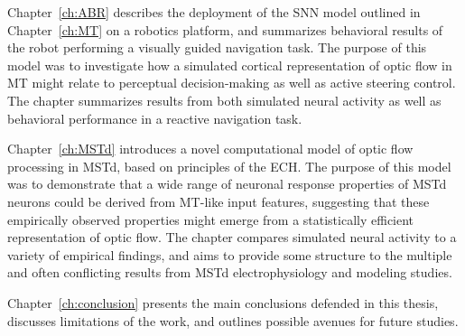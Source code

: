 Chapter~\ref{ch:ABR} describes the deployment of the \ac{SNN} model outlined in
Chapter~\ref{ch:MT} on a robotics platform, and summarizes behavioral results
of the robot performing a visually guided navigation task.
The purpose of this model was to investigate how a simulated cortical representation
of optic flow in \ac{MT} might relate to perceptual decision-making 
as well as active steering control.
The chapter summarizes results from both simulated neural activity as well as
behavioral performance in a reactive navigation task.

Chapter~\ref{ch:MSTd} introduces a novel computational model of optic flow
processing in \ac{MSTd}, based on principles of the \acf{ECH}.
The purpose of this model was to demonstrate that a wide range of neuronal
response properties of \ac{MSTd} neurons could be derived from \ac{MT}-like
input features, suggesting that these empirically observed properties 
might emerge from a statistically efficient representation of optic flow.
The chapter compares simulated neural activity to a variety of empirical findings,
and aims to provide some structure to the multiple and often conflicting
results from \ac{MSTd} electrophysiology and modeling studies.

Chapter~\ref{ch:conclusion} presents the main conclusions defended in this
thesis, discusses limitations of the work, and outlines possible avenues for
future studies.
